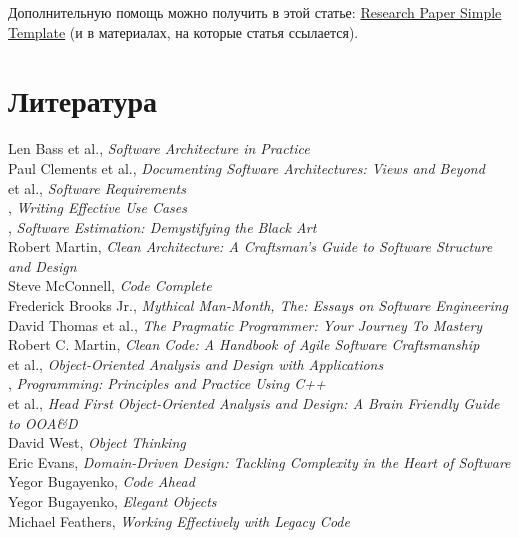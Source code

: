 \documentclass[nobrand,anonymous,nodate,nosecurity]{huawei}
\begin{document}
Дополнительную помощь можно получить в этой статье:
\href{https://www.yegor256.com/2022/08/24/research-paper-template.html}{Research Paper Simple Template}
(и в материалах, на которые статья ссылается).

\section{Литература}

\begin{multicols}{2}\small\raggedright
Len Bass et al., \emph{Software Architecture in Practice}\\[3pt]
Paul Clements et al., \emph{Documenting Software Architectures: Views and Beyond}\\[3pt]
 et al., \emph{Software Requirements}\\[3pt]
{}, \emph{Writing Effective Use Cases}\\[3pt]
{}, \emph{Software Estimation: Demystifying the Black Art}\\[3pt]
{Robert Martin}, \emph{Clean Architecture: A Craftsman's Guide to Software Structure and Design}\\[3pt]
{Steve McConnell}, \emph{Code Complete}\\[3pt]
{Frederick Brooks Jr.}, \emph{Mythical Man-Month, The: Essays on Software Engineering}\\[3pt]
{David Thomas et al.}, \emph{The Pragmatic Programmer: Your Journey To Mastery}\\[3pt]
{Robert C. Martin}, \emph{Clean Code: A Handbook of Agile Software Craftsmanship}\\[3pt]
{ et al.}, \emph{Object-Oriented Analysis and Design with Applications}\\[3pt]
{}, \emph{Programming: Principles and Practice Using C++}\\[3pt]
{ et al.}, \emph{Head First Object-Oriented Analysis and Design: A Brain Friendly Guide to OOA\&D}\\[3pt]
{David West}, \emph{Object Thinking}\\[3pt]
{Eric Evans}, \emph{Domain-Driven Design: Tackling Complexity in the Heart of Software}\\[3pt]
{Yegor Bugayenko}, \emph{Code Ahead}\\[3pt]
{Yegor Bugayenko}, \emph{Elegant Objects}\\[3pt]
{Michael Feathers}, \emph{Working Effectively with Legacy Code}\\[3pt]

\end{multicols}
\end{document}
